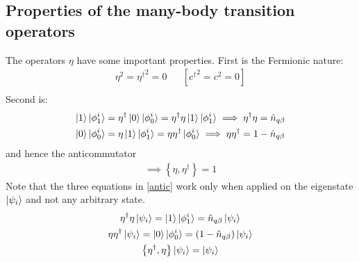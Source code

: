 \subsection*{Properties of the many-body transition operators}
The operators \(\eta\) have some important properties. First is the Fermionic nature:
\begin{equation}\begin{aligned}
	\eta^2 = {\eta^\dagger}^2 = 0 &&\left[{c^\dagger}^2 = c^2 = 0\right]\\
\end{aligned}\end{equation}
Second is:
\begin{equation}\begin{aligned}
	\label{antic}
    \ket{1}\ket{\phi_1^i} &= {\eta}^\dagger\ket{0}\ket{\phi_0^i} = \eta^\dagger \eta \ket{1}\ket{\phi_1^i} \implies \eta^\dagger \eta = \hat n_{q\beta}\\
    \ket{0}\ket{\phi_0^i} &= \eta\ket{1}\ket{\phi_1^i} = \eta \eta^\dagger\ket{\phi_0^i}\implies \eta  \eta^\dagger= 1 - \hat n_{q\beta}
\end{aligned}\end{equation}
and hence the anticommutator
\begin{equation}\begin{aligned}
	\label{antico}
    \implies \left\{\eta,\eta^\dagger\right\} = 1
\end{aligned}\end{equation}
Note that the three equations in \ref{antic} work only when applied on the eigenstate \(\ket{\psi_i}\) and not any arbitrary state.
\begin{equation*}
    \begin{gathered}
    \eta^\dagger \eta \ket{\psi_i} = \ket{1}\ket{\phi_1^i} = \hat n_{q\beta}\ket{\psi_i}\\
    \eta\eta^\dagger \ket{\psi_i} = \ket{0}\ket{\phi_0^i} = \left(1 - \hat n_{q\beta}\right)\ket{\psi_i}\\
    \left\{\eta^\dagger,\eta\right\}\ket{\psi_i} = \ket{\psi_i}
\end{gathered}
\end{equation*}
